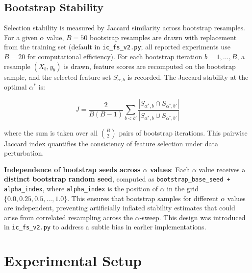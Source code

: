 \documentclass[a4paper,fleqn]{cas-sc}
\begin{document}
\subsection{Bootstrap Stability}

Selection stability is measured by Jaccard similarity across bootstrap resamples. For a given $\alpha$ value, $B = 50$ bootstrap resamples are drawn with replacement from the training set (default in \texttt{ic\_fs\_v2.py};  all reported experiments use $B = 20$ for computational efficiency). For each bootstrap iteration $b = 1, \ldots, B$, a resample $(X_b, y_b)$ is drawn, feature scores are recomputed on the bootstrap sample, and the selected feature set $S_{\alpha, b}$ is recorded. The Jaccard stability at the optimal $\alpha^*$ is:

\begin{equation}
    J = \frac{2}{B(B-1)} \sum_{b < b'} \frac{|S_{\alpha^*,b} \cap S_{\alpha^*,b'}|}{|S_{\alpha^*,b} \cup S_{\alpha^*,b'}|}
\end{equation}

where the sum is taken over all $\binom{B}{2}$ pairs of bootstrap iterations. This pairwise Jaccard index quantifies the consistency of feature selection under data perturbation.

\textbf{Independence of bootstrap seeds across $\alpha$ values}: Each $\alpha$ value receives a \textbf{distinct bootstrap random seed}, computed as \texttt{bootstrap\_base\_seed + alpha\_index}, where \texttt{alpha\_index} is the position of $\alpha$ in the grid $\{0.0, 0.25, 0.5, \ldots, 1.0\}$. This ensures that bootstrap samples for different $\alpha$ values are independent, preventing artificially inflated stability estimates that could arise from correlated resampling across the $\alpha$-sweep. This design was introduced in \texttt{ic\_fs\_v2.py} to address a subtle bias in earlier implementations.


\section{Experimental Setup}
\label{sec:experiments}
\end{document}
